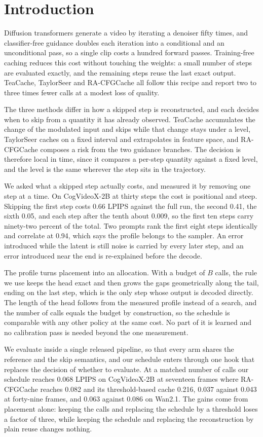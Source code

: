 \section{Introduction}

Diffusion transformers generate a video by iterating a denoiser fifty times, and classifier-free guidance doubles each iteration into a conditional and an unconditional pass, so a single clip costs a hundred forward passes. Training-free caching reduces this cost without touching the weights: a small number of steps are evaluated exactly, and the remaining steps reuse the last exact output. TeaCache, TaylorSeer and RA-CFGCache all follow this recipe and report two to three times fewer calls at a modest loss of quality.

The three methods differ in how a skipped step is reconstructed, and each decides when to skip from a quantity it has already observed. TeaCache accumulates the change of the modulated input and skips while that change stays under a level, TaylorSeer caches on a fixed interval and extrapolates in feature space, and RA-CFGCache composes a risk from the two guidance branches. The decision is therefore local in time, since it compares a per-step quantity against a fixed level, and the level is the same wherever the step sits in the trajectory.

We asked what a skipped step actually costs, and measured it by removing one step at a time. On CogVideoX-2B at thirty steps the cost is positional and steep. Skipping the first step costs 0.66 LPIPS against the full run, the second 0.41, the sixth 0.05, and each step after the tenth about 0.009, so the first ten steps carry ninety-two percent of the total. Two prompts rank the first eight steps identically and correlate at 0.94, which says the profile belongs to the sampler. An error introduced while the latent is still noise is carried by every later step, and an error introduced near the end is re-explained before the decode.

The profile turns placement into an allocation. With a budget of $B$ calls, the rule we use keeps the head exact and then grows the gaps geometrically along the tail, ending on the last step, which is the only step whose output is decoded directly. The length of the head follows from the measured profile instead of a search, and the number of calls equals the budget by construction, so the schedule is comparable with any other policy at the same cost. No part of it is learned and no calibration pass is needed beyond the one measurement.

We evaluate inside a single released pipeline, so that every arm shares the reference and the skip semantics, and our schedule enters through one hook that replaces the decision of whether to evaluate. At a matched number of calls our schedule reaches 0.068 LPIPS on CogVideoX-2B at seventeen frames where RA-CFGCache reaches 0.082 and its threshold-based cache 0.216, 0.037 against 0.043 at forty-nine frames, and 0.063 against 0.086 on Wan2.1. The gains come from placement alone: keeping the calls and replacing the schedule by a threshold loses a factor of three, while keeping the schedule and replacing the reconstruction by plain reuse changes nothing.
